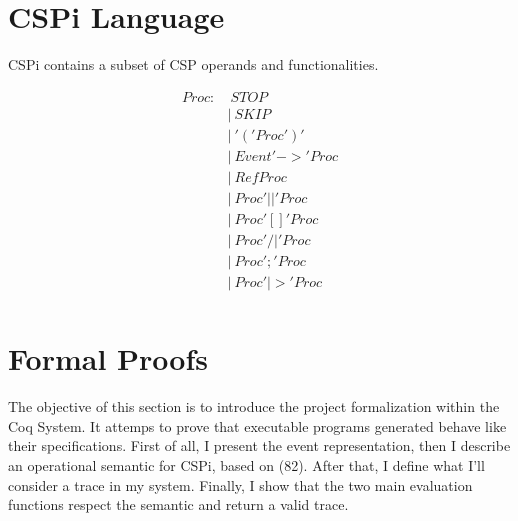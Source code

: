 \documentclass{comjnl}
\begin{document}
\section{CSPi Language}
CSPi contains a subset of CSP operands and functionalities. 


\begin{align}
Proc    :&\> STOP             \\
        &|\> SKIP             \\
        &|\> '(' Proc ')'     \\
        &|\> Event '->' Proc  \\
        &|\> RefProc          \\
        &|\> Proc '||' Proc   \\
        &|\> Proc '[]' Proc   \\
        &|\> Proc '/|' Proc   \\
        &|\> Proc ';' Proc    \\
        &|\> Proc '|>' Proc   \\
\end{align}


\section{Formal Proofs}
The objective of this section is to introduce the project formalization within the Coq System. It attemps to prove that executable programs generated behave like their specifications. First of all, I present the event representation, then  I describe an operational semantic for CSPi, based on (82). After that, I define what I'll consider a trace in my system. Finally, I show that the two main evaluation functions respect the semantic and return a valid trace.
\end{document}
